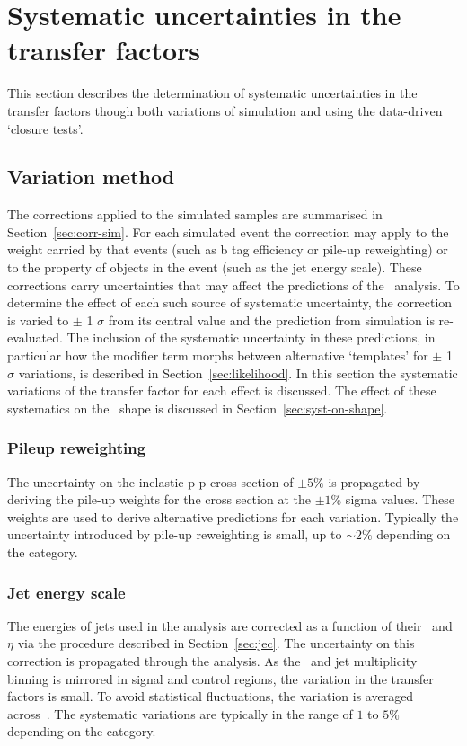 \section{Systematic uncertainties in the transfer factors}
\label{sec:syst-uncs}
This section describes the determination of systematic uncertainties 
in the transfer factors though both variations of simulation
and using the data-driven `closure tests'. 

\subsection{Variation method}
\label{sec:syst-uncs-var}
The corrections applied to the simulated samples are summarised in Section~\ref{sec:corr-sim}. For each 
simulated event the correction may apply to the weight carried by that events (such as b tag efficiency
or pile-up reweighting) or to the property of objects in the event (such as the jet energy scale). 
These corrections carry uncertainties that may affect the predictions of the \alphat~analysis.
To determine the effect of each such source of systematic uncertainty, the correction is varied to $\pm$ 1 $\sigma$ from its central value and the prediction from simulation is re-evaluated. The inclusion of the systematic uncertainty 
in these predictions, in particular how the modifier term morphs between alternative `templates'  
for $\pm$ 1 $\sigma$ variations, is described in Section~\ref{sec:likelihood}. In this section the systematic variations
of the transfer factor for each effect is discussed. The effect of these systematics on 
the \mht~shape is discussed in Section~\ref{sec:syst-on-shape}.

\subsubsection{Pileup reweighting}

The uncertainty on the inelastic p-p cross section of $\pm5\%$ is propagated by deriving the pile-up
weights for the cross section at the $\pm1\%$ sigma values. These weights are used to derive
alternative predictions for each variation. Typically the uncertainty 
introduced by pile-up reweighting is small, up to $\sim2\%$ depending on the category.

\subsubsection{Jet energy scale}
The energies of jets used in the analysis are corrected as a function of their \pt~and
$\eta$ via the procedure described in Section~\ref{sec:jec}. The uncertainty on
this correction is propagated through the analysis. As the \scalht~and jet multiplicity binning is 
mirrored in signal and control regions, the variation in the transfer factors is small.
To avoid statistical fluctuations, the variation is averaged across~\nb.
The systematic variations are typically in the range of $1$ to $5\%$ depending on the category.

